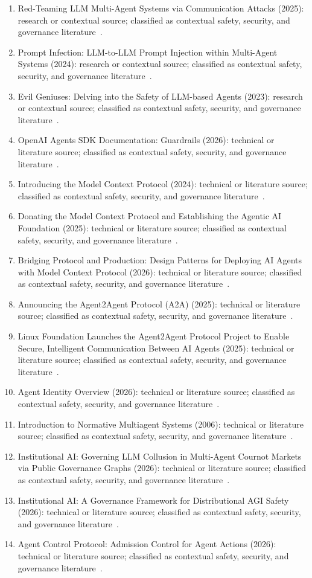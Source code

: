 \begin{enumerate}
\item Red-Teaming {LLM} Multi-Agent Systems via Communication Attacks (2025): research or contextual source; classified as contextual safety, security, and governance literature~\cite{ext075}.
\item Prompt Infection: {LLM}-to-{LLM} Prompt Injection within Multi-Agent Systems (2024): research or contextual source; classified as contextual safety, security, and governance literature~\cite{ext106}.
\item Evil Geniuses: Delving into the Safety of {LLM}-based Agents (2023): research or contextual source; classified as contextual safety, security, and governance literature~\cite{ext107}.
\item {OpenAI Agents SDK} Documentation: Guardrails (2026): technical or literature source; classified as contextual safety, security, and governance literature~\cite{ext118}.
\item Introducing the Model Context Protocol (2024): technical or literature source; classified as contextual safety, security, and governance literature~\cite{ext120}.
\item Donating the Model Context Protocol and Establishing the Agentic AI Foundation (2025): technical or literature source; classified as contextual safety, security, and governance literature~\cite{ext123}.
\item Bridging Protocol and Production: Design Patterns for Deploying {AI} Agents with Model Context Protocol (2026): technical or literature source; classified as contextual safety, security, and governance literature~\cite{ext124}.
\item Announcing the Agent2Agent Protocol ({A2A}) (2025): technical or literature source; classified as contextual safety, security, and governance literature~\cite{ext125}.
\item Linux Foundation Launches the Agent2Agent Protocol Project to Enable Secure, Intelligent Communication Between {AI} Agents (2025): technical or literature source; classified as contextual safety, security, and governance literature~\cite{ext126}.
\item Agent Identity Overview (2026): technical or literature source; classified as contextual safety, security, and governance literature~\cite{ext128}.
\item Introduction to Normative Multiagent Systems (2006): technical or literature source; classified as contextual safety, security, and governance literature~\cite{ext142}.
\item Institutional {AI}: Governing {LLM} Collusion in Multi-Agent {Cournot} Markets via Public Governance Graphs (2026): technical or literature source; classified as contextual safety, security, and governance literature~\cite{ext144}.
\item Institutional {AI}: A Governance Framework for Distributional {AGI} Safety (2026): technical or literature source; classified as contextual safety, security, and governance literature~\cite{ext145}.
\item Agent Control Protocol: Admission Control for Agent Actions (2026): technical or literature source; classified as contextual safety, security, and governance literature~\cite{ext146}.
\end{enumerate}

